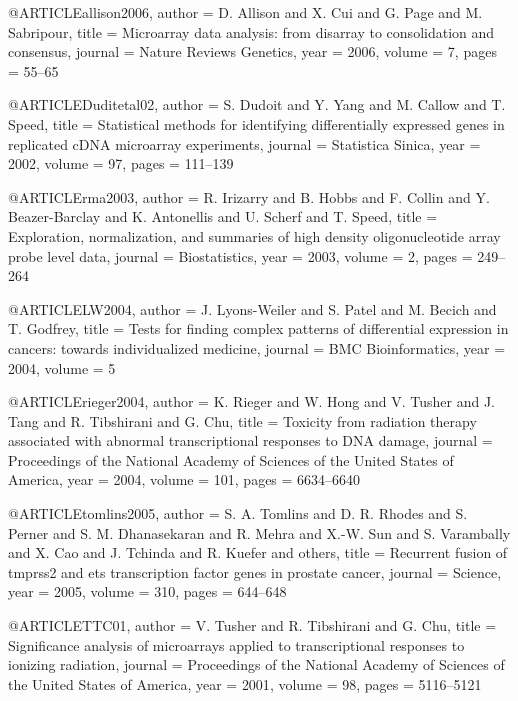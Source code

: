 
@ARTICLE{allison2006,
  author =       {D. Allison and X. Cui and G. Page and M. Sabripour},
  title =        {Microarray data analysis: from disarray to consolidation and consensus},
  journal =      {Nature Reviews Genetics},
  year =         {2006},
  volume =       {7},
  pages =        {55--65}
}

@ARTICLE{Duditetal02,
  author =       {S. Dudoit and Y. Yang and M. Callow and T. Speed},
  title =        {Statistical methods for identifying differentially expressed genes in replicated {cDNA} microarray experiments},
  journal =      {Statistica Sinica},
  year =         {2002},
  volume =       {97},
  pages =        {111--139}
}

@ARTICLE{rma2003,
  author =       {R. Irizarry and B. Hobbs and F. Collin and Y. Beazer-Barclay and K. Antonellis and U. Scherf and T. Speed},
  title =        {Exploration, normalization, and summaries of high density oligonucleotide array probe level data},
  journal =      {Biostatistics},
  year =         {2003},
  volume =       {2},
  pages =        {249--264}
}

@ARTICLE{LW2004,
  author =       {J. Lyons-Weiler and S. Patel and M. Becich and T. Godfrey},
  title =        {Tests for finding complex patterns of differential expression in cancers: towards individualized medicine},
  journal =      {BMC Bioinformatics},
  year =         {2004},
  volume =       {5}
}

@ARTICLE{rieger2004,
  author =       {K. Rieger and W. Hong and V. Tusher and J. Tang and R. Tibshirani and G. Chu},
  title =        {Toxicity from radiation therapy associated with abnormal transcriptional responses to {DNA} damage},
  journal =      {Proceedings of the National Academy of Sciences of the United States of America},
  year =         {2004},
  volume =       {101},
  pages =        {6634--6640}
}

@ARTICLE{tomlins2005,
  author =       {S. A. Tomlins and D. R. Rhodes and S. Perner and S. M. Dhanasekaran and R. Mehra and X.-W. Sun
                  and S. Varambally and X. Cao and J. Tchinda and R. Kuefer and others},
  title =        {Recurrent fusion of tmprss2 and ets transcription factor genes in prostate cancer},
  journal =      {Science},
  year =         {2005},
  volume =       {310},
  pages =        {644--648}
}

@ARTICLE{TTC01,
  author =       {V. Tusher and R. Tibshirani and G. Chu},
  title =        {Significance analysis of microarrays applied to transcriptional responses to ionizing radiation},
  journal =      {Proceedings of the National Academy of Sciences of the United States of America},
  year =         {2001},
  volume =       {98},
  pages =        {5116--5121}
}


